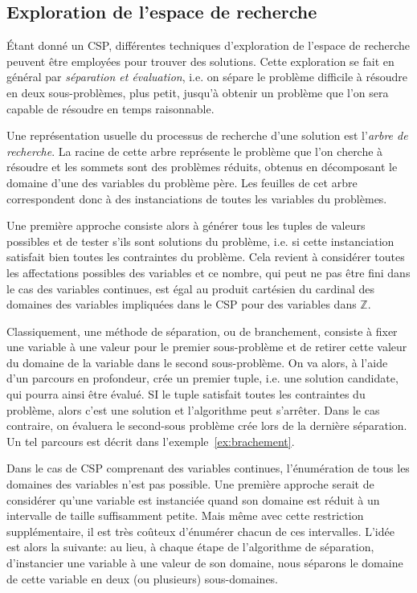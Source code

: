 \subsection{Exploration de l'espace de recherche}
\label{sec:PPC_rech}

{\'E}tant donné un CSP, différentes techniques d'exploration de
l'espace de recherche peuvent être employées pour trouver des
solutions. Cette exploration se fait en général par {\it séparation et
  évaluation}, i.e. on sépare le problème difficile à résoudre en deux
sous-problèmes, plus petit, jusqu'à obtenir un problème que l'on sera
capable de résoudre en temps raisonnable.  

Une représentation usuelle du processus de recherche d'une solution
est l'{\it arbre de recherche}. La racine de cette arbre représente le
problème que l'on cherche à résoudre et les sommets sont des problèmes
réduits, obtenus en décomposant le domaine d'une des variables du
problème père. Les feuilles de cet arbre correspondent donc à des
instanciations de toutes les variables du problèmes.

Une première approche consiste alors à générer tous les
tuples de valeurs possibles et de tester s'ils sont solutions du
problème, i.e. si cette instanciation satisfait bien toutes les
contraintes du problème. Cela revient à considérer toutes les
affectations possibles des variables et ce nombre, qui peut ne pas
être fini dans le cas des variables continues, est égal au produit
cartésien du cardinal des domaines des variables impliquées dans le
CSP pour des variables dans $\mathbb{Z}$.

Classiquement, une méthode de séparation, ou de branchement, consiste
à fixer une variable à une valeur pour le premier sous-problème et de
retirer cette valeur du domaine de la variable dans le second
sous-problème. On va alors, à l'aide d'un parcours en profondeur, crée
un premier tuple, i.e. une solution candidate, qui pourra ainsi être
évalué. SI le tuple satisfait toutes les contraintes du problème,
alors c'est une solution et l'algorithme peut s'arrêter. Dans le cas 
contraire, on évaluera le second-sous problème crée lors de la
dernière séparation. Un tel parcours est décrit dans
l'exemple~\ref{ex:brachement}.

Dans le cas de CSP comprenant des variables continues, l'énumération
de tous les domaines des variables n'est pas possible. Une première
approche serait de considérer qu'une variable est instanciée quand son
domaine est réduit à un intervalle de taille suffisamment petite. Mais
même avec cette restriction supplémentaire, il est très coûteux
d'énumérer chacun de ces intervalles. L'idée est alors la suivante: au
lieu, à chaque étape de l'algorithme de séparation, d'instancier une
variable à une valeur de son domaine, nous séparons le domaine de
cette variable en deux (ou plusieurs) sous-domaines.

